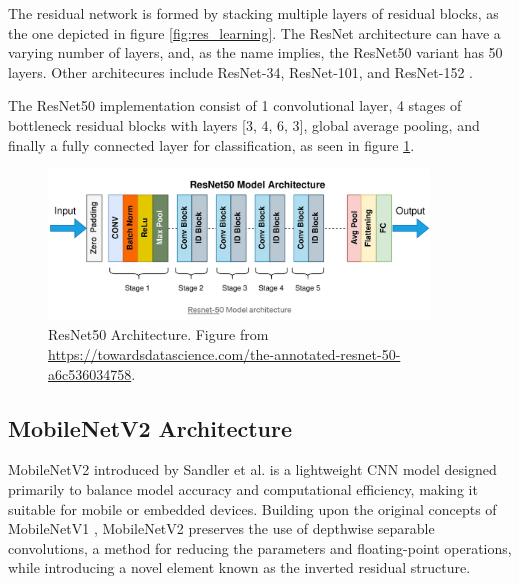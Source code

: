 The residual network is formed by stacking multiple layers of residual blocks, as the one depicted in figure \ref{fig:res_learning}. The ResNet architecture can have a varying number of layers, and, as the name implies, the ResNet50 variant has 50 layers. Other architecures include ResNet-34, ResNet-101, and ResNet-152 \cite{he2016identitymappingsdeepresidual}. 

The ResNet50 implementation consist of 1 convolutional layer, 4 stages of bottleneck residual blocks with layers [3, 4, 6, 3], global average pooling, and finally a fully connected layer for classification\cite{torchvision-resnet}, as seen in figure \ref{fig:resnet50}. 

\begin{figure}[ht]
    \centering
    \includegraphics[width=0.9\textwidth]{Images/resnet50.png} 
    \caption{ResNet50 Architecture. Figure from \url{https://towardsdatascience.com/the-annotated-resnet-50-a6c536034758}. }
    \label{fig:resnet50}
\end{figure}


\subsection{MobileNetV2 Architecture}
\label{sec:mobilenet}
MobileNetV2 introduced by Sandler et al. \cite{sandler2018mobilenetv2} is a lightweight CNN model designed primarily to balance model accuracy and computational efficiency, making it suitable for mobile or embedded devices. Building upon the original concepts of MobileNetV1 \cite{howard2017mobilenetsefficientconvolutionalneural}, MobileNetV2 preserves the use of depthwise separable convolutions, a method for reducing the parameters and floating-point operations, while introducing a novel element known as the inverted residual structure. 


